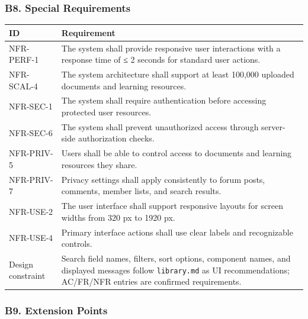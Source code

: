 \documentclass[12pt]{article}
\renewcommand{\baselinestretch}{1.5}
\begin{document}
\hypertarget{sec:b8-special-requirements}{}
\subsubsection*{B8. Special Requirements}
\par\medskip

\begingroup
\small
\renewcommand{\baselinestretch}{1.0}\selectfont
\renewcommand{\arraystretch}{1.15}
\setlength{\tabcolsep}{6pt}
\begin{longtable}{|>{\raggedright\arraybackslash}p{}|>{\raggedright\arraybackslash}p{}|}
\hline
\textbf{ID} & \textbf{Requirement} \\ \hline
\endhead
NFR-PERF-1 & The system shall provide responsive user interactions with a response time of ≤ 2 seconds for standard user actions. \\ \hline
NFR-SCAL-4 & The system architecture shall support at least 100,000 uploaded documents and learning resources. \\ \hline
NFR-SEC-1 & The system shall require authentication before accessing protected user resources. \\ \hline
NFR-SEC-6 & The system shall prevent unauthorized access through server-side authorization checks. \\ \hline
NFR-PRIV-5 & Users shall be able to control access to documents and learning resources they share. \\ \hline
NFR-PRIV-7 & Privacy settings shall apply consistently to forum posts, comments, member lists, and search results. \\ \hline
NFR-USE-2 & The user interface shall support responsive layouts for screen widths from 320 px to 1920 px. \\ \hline
NFR-USE-4 & Primary interface actions shall use clear labels and recognizable controls. \\ \hline
Design constraint & Search field names, filters, sort options, component names, and displayed messages follow \texttt{library.md} as UI recommendations; AC/FR/NFR entries are confirmed requirements. \\ \hline
\end{longtable}
\endgroup
\par\medskip

\hypertarget{sec:b9-extension-points}{}
\subsubsection*{B9. Extension Points}
\par\medskip
\end{document}
